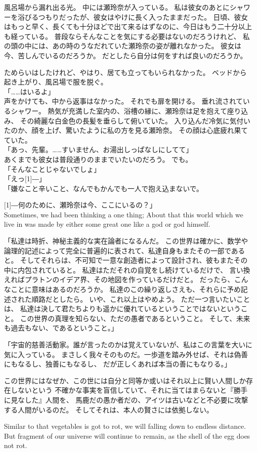 \documentclass[autodetect-engine,dvipdfmx-if-dvi,a5paper,ja=standard,twoside,titlepage,final,twocolumn]{ltjtbook}
\begin{document}
風呂場から漏れ出る光。
中には瀬玲奈が入っている。
私は彼女のあとにシャワーを浴びるつもりだったが、彼女はやけに長く入ったままだった。
日頃、彼女はもっと早く、長くても十分ほどで出て来るはずなのに、今日はもう二十分以上も経っている。
普段ならそんなことを気にする必要はないのだろうけれど、
私の頭の中には、あの時のうなだれていた瀬玲奈の姿が離れなかった。
彼女は今、苦しんでいるのだろうか。
だとしたら自分は何をすれば良いのだろうか。

ためらいはしたけれど、やはり、居ても立ってもいられなかった。
ベッドから起き上がり、風呂場で服を脱ぐ。\\
「……はいるよ」\\
声をかけても、中から返事はなかった。
それでも扉を開ける。
垂れ流されているシャワー。
熱気が充満した室内の、浴槽の縁に、瀬玲奈は足を抱えて座り込み、
その綺麗な白金色の長髪を垂らして俯いていた。
入り込んだ冷気に気付いたのか、顔を上げ、驚いたように私の方を見る瀬玲奈。
その顔は心底疲れ果てていた。\\
「あっ、先輩。……すいません、お湯出しっぱなしにしてて」\\
あくまでも彼女は普段通りのままでいたいのだろう。
でも。\\
「そんなことじゃないでしょ」\\
「えっ\scalebox{3}[1]{―}」\\
「嫌なこと辛いこと、なんでもかんでも一人で抱え込まないで。

\scalebox{3}[1]{―}何のために、瀬玲奈は今、ここにいるの？」\\

Sometimes, we had been thinking a one thing; 
About that this world which we live in 
was made by either some great one like a god or god himself.

「私達は時折、神秘主義的な実在論者になるんだ。
この世界は確かに、数学や論理的記述によって完全に普遍的に表されて、私達自身もまたその一部であると。
そしてそれらは、不可知で一意な創造者によって設計され、彼もまたその中に内包されていると。
私達はただそれの自覚をし続けているだけで、
言い換えればプラトンのイデア界、その地図を作っているだけだと。
だったら、こんなことに意味はあるのだろうか。
私達のこの繰り返しさえも、それらに予め記述された順路だとしたら。
いや、これ以上はやめよう。
ただ一つ言いたいことは、
私達は決して君たちよりも遥かに優れているということではないということ。
この世界の真理を知らない、ただの愚者であるということ。
そして、未来も過去もない、であるということ。」

「宇宙的慈善活動家。誰が言ったのかは覚えていないが、私はこの言葉を大いに気に入っている。
まさしく我々そのものだ。一歩道を踏み外せば、それは偽善にもなるし、独善にもなるし、
だが正しくあれば本当の善にもなりる。」

この世界にはなぜか、この世には自分と同等か或いはそれ以上に賢い人間しか存在しないという
不確かな事実を盲信していて、それに当てはまらないと『勝手に見なした』人間を、
馬鹿だの愚か者だの、アイツは古いなどと不必要に攻撃する人間がいるのだ。
そしてそれは、本人の賢さには依拠しない。

Similar to that vegetables is got to rot, we will falling down to endless distance.
But fragment of our universe will continue to remain, as the shell of the egg does not rot.
\end{document}
